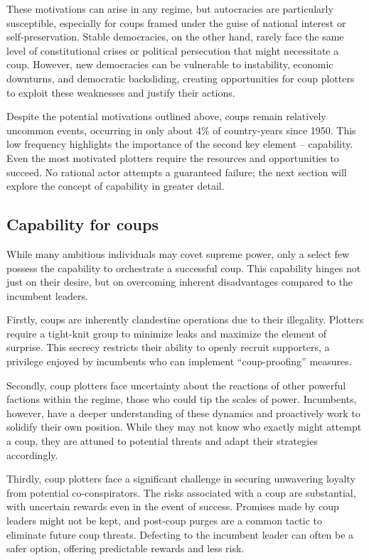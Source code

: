 \documentclass[
  12pt,
]{report}
\begin{document}
These motivations can arise in any regime, but autocracies are
particularly susceptible, especially for coups framed under the guise of
national interest or self-preservation. Stable democracies, on the other
hand, rarely face the same level of constitutional crises or political
persecution that might necessitate a coup. However, new democracies can
be vulnerable to instability, economic downturns, and democratic
backsliding, creating opportunities for coup plotters to exploit these
weaknesses and justify their actions.

Despite the potential motivations outlined above, coups remain
relatively uncommon events, occurring in only about 4\% of country-years
since 1950. This low frequency highlights the importance of the second
key element -- capability. Even the most motivated plotters require the
resources and opportunities to succeed. No rational actor attempts a
guaranteed failure; the next section will explore the concept of
capability in greater detail.

\subsection{Capability for coups}\label{capability-for-coups}

While many ambitious individuals may covet supreme power, only a select
few possess the capability to orchestrate a successful coup. This
capability hinges not just on their desire, but on overcoming inherent
disadvantages compared to the incumbent leaders.

Firstly, coups are inherently clandestine operations due to their
illegality. Plotters require a tight-knit group to minimize leaks and
maximize the element of surprise. This secrecy restricts their ability
to openly recruit supporters, a privilege enjoyed by incumbents who can
implement ``coup-proofing'' measures.

Secondly, coup plotters face uncertainty about the reactions of other
powerful factions within the regime, those who could tip the scales of
power. Incumbents, however, have a deeper understanding of these
dynamics and proactively work to solidify their own position. While they
may not know who exactly might attempt a coup, they are attuned to
potential threats and adapt their strategies accordingly.

Thirdly, coup plotters face a significant challenge in securing
unwavering loyalty from potential co-conspirators. The risks associated
with a coup are substantial, with uncertain rewards even in the event of
success. Promises made by coup leaders might not be kept, and post-coup
purges are a common tactic to eliminate future coup threats. Defecting
to the incumbent leader can often be a safer option, offering
predictable rewards and less risk.
\end{document}
